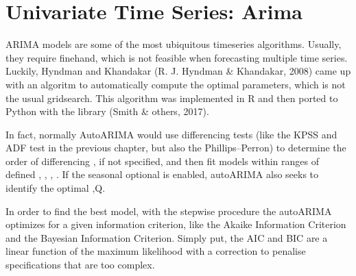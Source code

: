 \documentclass[letterpaper,10pt,english]{jupyterBook}
\begin{document}
\section{Univariate Time Series: Arima}
\label{\detokenize{06-forecasting:univariate-time-series-arima}}
\sphinxAtStartPar
ARIMA models are some of the most ubiquitous time\sphinxhyphen{}series algorithms. Usually, they require fine\sphinxhyphen{}hand, which is not feasible when forecasting multiple time series. Luckily, Hyndman and Khandakar (R. J. Hyndman \& Khandakar, 2008) came up with an algoritm to automatically compute the optimal parameters, which is not the usual grid\sphinxhyphen{}search. This algorithm was implemented in R and then ported to Python with the  library (Smith \& others, 2017).

\sphinxAtStartPar
In fact, normally Auto\sphinxhyphen{}ARIMA would use differencing tests (like the KPSS and ADF test in the previous chapter, but also the Phillips–Perron) to determine the order of differencing , if not specified, and then fit models within ranges of defined , , , . If the seasonal optional is enabled, auto\sphinxhyphen{}ARIMA also seeks to identify the optimal ,Q.

\sphinxAtStartPar
In order to find the best model, with the stepwise procedure the auto\sphinxhyphen{}ARIMA optimizes for a given information criterion, like the Akaike Information Criterion and the Bayesian Information Criterion. Simply put, the AIC and BIC are a linear function of the maximum likelihood with a correction to penalise specifications that are too complex.
\end{document}
